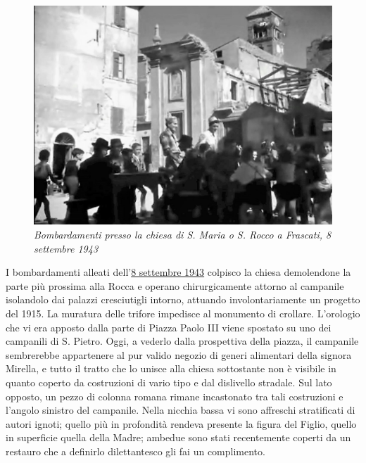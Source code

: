 \documentclass[
  letterpaper,
  DIV=11,
  numbers=noendperiod]{scrartcl}
\begin{document}
\begin{figure}

{\centering \includegraphics{../../images/2024/san_rocco/6san-rocco-bombe.jpg}

}

\caption{\emph{Bombardamenti presso la chiesa di S. Maria o S. Rocco a
Frascati, 8 settembre 1943}}

\end{figure}

I bombardamenti alleati
dell'\href{2016-09-07-8-settembre-frascati-tuscolo-comandini.html}{8
settembre 1943} colpisco la chiesa demolendone la parte più prossima
alla Rocca e operano chirurgicamente attorno al campanile isolandolo dai
palazzi cresciutigli intorno, attuando involontariamente un progetto del
1915. La muratura delle trifore impedisce al monumento di crollare.
L'orologio che vi era apposto dalla parte di Piazza Paolo III viene
spostato su uno dei campanili di S. Pietro. Oggi, a vederlo dalla
prospettiva della piazza, il campanile sembrerebbe appartenere al pur
valido negozio di generi alimentari della signora Mirella, e tutto il
tratto che lo unisce alla chiesa sottostante non è visibile in quanto
coperto da costruzioni di vario tipo e dal dislivello stradale. Sul lato
opposto, un pezzo di colonna romana rimane incastonato tra tali
costruzioni e l'angolo sinistro del campanile. Nella nicchia bassa vi
sono affreschi stratificati di autori ignoti; quello più in profondità
rendeva presente la figura del Figlio, quello in superficie quella della
Madre; ambedue sono stati recentemente coperti da un restauro che a
definirlo dilettantesco gli fai un complimento.
\end{document}

